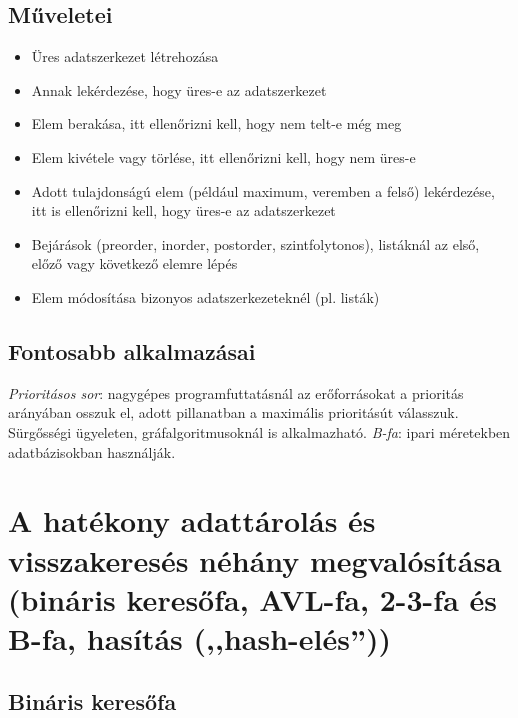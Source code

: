\documentclass[margin=0px]{article}
\begin{document}
\subsection{Műveletei}

\begin{itemize}
    \item Üres adatszerkezet létrehozása
    \item Annak lekérdezése, hogy üres-e az adatszerkezet
    \item Elem berakása, itt ellenőrizni kell, hogy nem telt-e még meg
    \item Elem kivétele vagy törlése, itt ellenőrizni kell, hogy nem üres-e
    \item Adott tulajdonságú elem (például maximum, veremben a felső) lekérdezése, itt is ellenőrizni kell, hogy üres-e az adatszerkezet
    \item Bejárások (preorder, inorder, postorder, szintfolytonos), listáknál az első, előző vagy következő elemre lépés
    \item Elem módosítása bizonyos adatszerkezeteknél (pl. listák)
\end{itemize}

\subsection{Fontosabb alkalmazásai}

\textit{Prioritásos sor}: nagygépes programfuttatásnál az erőforrásokat a prioritás arányában osszuk el, adott pillanatban a maximális prioritásút válasszuk. Sürgősségi ügyeleten, gráfalgoritmusoknál is alkalmazható.
\textit{B-fa}: ipari méretekben adatbázisokban használják.

\section{A hatékony adattárolás és visszakeresés néhány megvalósítása (bináris keresőfa, AVL-fa, 2-3-fa és B-fa, hasítás (,,hash-elés”))}

\subsection{Bináris keresőfa}
\end{document}
